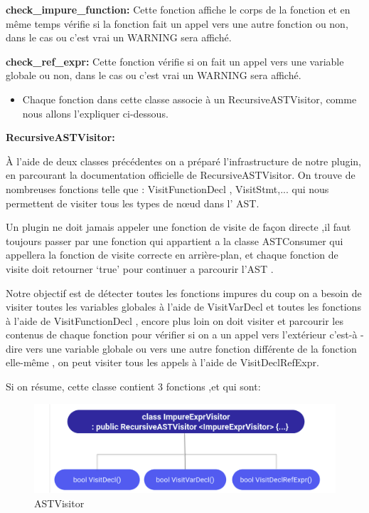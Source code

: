 \documentclass[12pt,a4paper]{article}
\begin{document}
\textbf{check\_impure\_function:}
 Cette fonction affiche le corps de la fonction et en même temps vérifie si la fonction fait un appel vers une autre fonction ou non, dans le cas ou c’est vrai un WARNING sera affiché. 

\textbf{check\_ref\_expr:}	
 Cette fonction vérifie si on fait un appel vers une variable globale ou non, dans le cas ou c’est vrai un WARNING sera affiché. 
\begin{itemize}
\item Chaque fonction dans cette classe associe à un RecursiveASTVisitor, comme nous allons l’expliquer ci-dessous.
\end{itemize}

\textbf{RecursiveASTVisitor:}

À l’aide de deux classes précédentes on a préparé l’infrastructure de notre plugin,  en parcourant  la documentation officielle de RecursiveASTVisitor. On trouve de nombreuses fonctions  telle que :  VisitFunctionDecl , VisitStmt,... qui nous  permettent de visiter tous les types de nœud dans l’ AST.

Un plugin ne doit jamais appeler une fonction de visite de façon directe ,il faut toujours passer par une fonction qui appartient a  la classe ASTConsumer qui appellera la fonction de visite correcte en arrière-plan, et chaque fonction de visite doit retourner ‘true’ pour continuer a parcourir l’AST  . 

Notre objectif est de détecter toutes les fonctions impures du coup on a besoin de visiter toutes les variables globales à l’aide  de  VisitVarDecl et toutes les fonctions à l’aide de VisitFunctionDecl , encore plus loin on doit visiter et parcourir les contenus de chaque fonction pour vérifier si on a un appel vers l’extérieur c’est-à -dire vers une variable globale ou vers une autre fonction différente de la fonction elle-même , on peut visiter tous les appels à l’aide de VisitDeclRefExpr.

Si on résume, cette  classe contient 3 fonctions ,et qui sont: 
\begin{figure}[H]
\centering
\includegraphics[scale=0.75]{vis-1.png} 
\caption[ASTVisitor]{ASTVisitor} 
\end{figure} 
\end{document}
